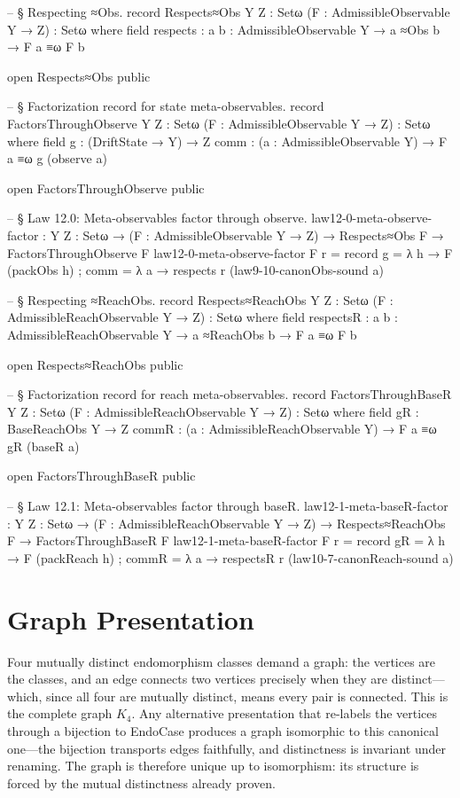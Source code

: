 \documentclass[11pt,a4paper]{book}
\def\texttt#1{#1}%
\begin{document}
\begin{code}
-- § Respecting ≈Obs.
record Respects≈Obs {Y Z : Setω} (F : AdmissibleObservable Y → Z) : Setω where
  field
    respects : {a b : AdmissibleObservable Y} → a ≈Obs b → F a ≡ω F b

open Respects≈Obs public

-- § Factorization record for state meta-observables.
record FactorsThroughObserve {Y Z : Setω} (F : AdmissibleObservable Y → Z) : Setω where
  field
    g    : (DriftState → Y) → Z
    comm : (a : AdmissibleObservable Y) → F a ≡ω g (observe a)

open FactorsThroughObserve public

-- § Law 12.0: Meta-observables factor through observe.
law12-0-meta-observe-factor :
  {Y Z : Setω} →
  (F : AdmissibleObservable Y → Z) →
  Respects≈Obs F →
  FactorsThroughObserve F
law12-0-meta-observe-factor F r =
  record
    { g = λ h → F (packObs h)
    ; comm = λ a →
        respects r (law9-10-canonObs-sound a)
    }

-- § Respecting ≈ReachObs.
record Respects≈ReachObs {Y Z : Setω} (F : AdmissibleReachObservable Y → Z) : Setω where
  field
    respectsR : {a b : AdmissibleReachObservable Y} → a ≈ReachObs b → F a ≡ω F b

open Respects≈ReachObs public

-- § Factorization record for reach meta-observables.
record FactorsThroughBaseR {Y Z : Setω} (F : AdmissibleReachObservable Y → Z) : Setω where
  field
    gR    : BaseReachObs Y → Z
    commR : (a : AdmissibleReachObservable Y) → F a ≡ω gR (baseR a)

open FactorsThroughBaseR public

-- § Law 12.1: Meta-observables factor through baseR.
law12-1-meta-baseR-factor :
  {Y Z : Setω} →
  (F : AdmissibleReachObservable Y → Z) →
  Respects≈ReachObs F →
  FactorsThroughBaseR F
law12-1-meta-baseR-factor F r =
  record
    { gR = λ h → F (packReach h)
    ; commR = λ a →
        respectsR r (law10-7-canonReach-sound a)
    }
\end{code}

\chapter{Graph Presentation}

Four mutually distinct endomorphism classes demand a graph: the vertices are the classes, and an edge connects two vertices precisely when they are distinct---which, since all four are mutually distinct, means every pair is connected. This is the complete graph $K_4$. Any alternative presentation that re-labels the vertices through a bijection to \texttt{EndoCase} produces a graph isomorphic to this canonical one---the bijection transports edges faithfully, and distinctness is invariant under renaming. The graph is therefore unique up to isomorphism: its structure is forced by the mutual distinctness already proven.
\end{document}

